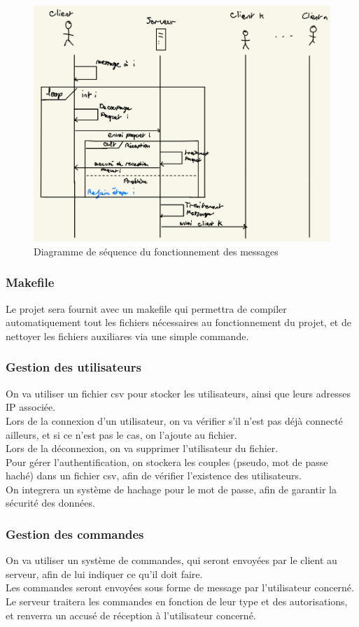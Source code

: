 \documentclass{cs-moi}
\begin{document}
\begin{figure}[h!]
    \centering
    \includegraphics[width=0.7\linewidth]{diagMsg.png}
    \caption{Diagramme de séquence du fonctionnement des messages}
\end{figure}


\subsubsection{Makefile}
Le projet sera fournit avec un makefile qui permettra de compiler automatiquement tout les fichiers nécessaires au fonctionnement du projet, et de nettoyer les fichiers auxiliares via une simple commande.\\

\subsubsection{Gestion des utilisateurs}
On va utiliser un fichier csv pour stocker les utilisateurs, ainsi que leurs adresses IP associée.\\
Lors de la connexion d'un utilisateur, on va vérifier s'il n'est pas déjà connecté ailleurs, et si ce n'est pas le cas, on l'ajoute au fichier.\\
Lors de la déconnexion, on va supprimer l'utilisateur du fichier.\\

Pour gérer l'authentification, on stockera les couples (pseudo, mot de passe haché) dans un fichier csv, afin de vérifier l'existence des utilisateurs.\\
On integrera un système de hachage pour le mot de passe, afin de garantir la sécurité des données.\\

\subsubsection{Gestion des commandes}
On va utiliser un système de commandes, qui seront envoyées par le client au serveur, afin de lui indiquer ce qu'il doit faire.\\
Les commandes seront envoyées sous forme de message par l'utilisateur concerné.\\
Le serveur traitera les commandes en fonction de leur type et des autorisations, et renverra un accusé de réception à l'utilisateur concerné.\\
\end{document}
